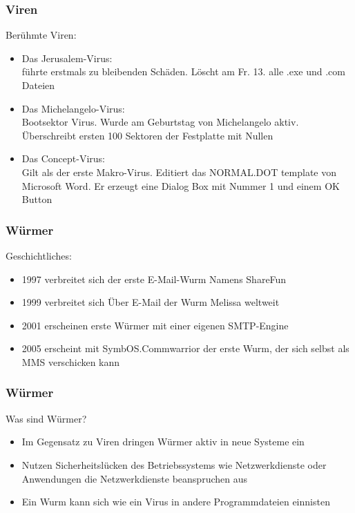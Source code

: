 \documentclass{beamer}
\begin{document}
\begin{frame}
	\frametitle{Viren}
	\begin{block}{Berühmte Viren:}
		\begin{itemize}
			\item Das Jerusalem-Virus:\\
			führte erstmals zu bleibenden Schäden. Löscht am Fr. 13. alle .exe und .com Dateien
			\item Das Michelangelo-Virus:\\
			Bootsektor Virus. Wurde am Geburtstag von Michelangelo aktiv. Überschreibt ersten 100 Sektoren der Festplatte mit Nullen
			\item Das Concept-Virus:\\
			Gilt als der erste Makro-Virus. Editiert das NORMAL.DOT template von Microsoft Word. Er erzeugt eine Dialog Box mit Nummer 1 und einem OK Button
		\end{itemize}
	\end{block}			
\end{frame}

\begin{frame}
	\frametitle{Würmer}
		\begin{block}{Geschichtliches:}
			\begin{itemize}
				\item 1997 verbreitet sich der erste E-Mail-Wurm Namens ShareFun
				\item 1999 verbreitet sich Über E-Mail der Wurm Melissa weltweit
				\item 2001 erscheinen erste Würmer mit einer eigenen SMTP-Engine
				\item 2005 erscheint mit SymbOS.Commwarrior der erste Wurm, der sich selbst als MMS verschicken kann
			\end{itemize}
		\end{block}
\end{frame}

\begin{frame}
	\frametitle{Würmer}
		\begin{block}{Was sind Würmer?}
			\begin{itemize}
				\item Im Gegensatz zu Viren dringen Würmer aktiv in neue Systeme ein
				\item Nutzen Sicherheitslücken des Betriebssystems wie Netzwerkdienste oder Anwendungen die Netzwerkdienste beanspruchen aus
				\item Ein Wurm kann sich wie ein Virus in andere Programmdateien einnisten
			\end{itemize}
		\end{block}
\end{frame}
\end{document}
